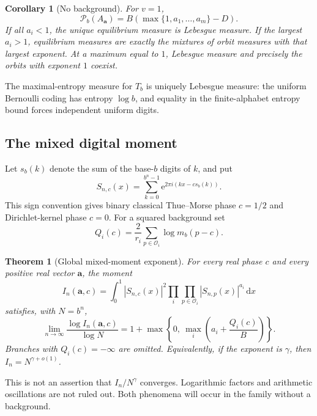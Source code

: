 \documentclass[11pt,a4paper]{article}
\numberwithin{equation}{section}
\newtheorem{theorem}{Theorem}[section]
\newtheorem{corollary}[corollary]{Corollary}\aliascntresetthe{corollary}
\theoremstyle{definition}
\theoremstyle{remark}
\newcommand{\dd}{\,\mathrm d}
\newcommand{\ee}{\mathrm e}
\newcommand{\cO}{\mathcal O}
\newcommand{\PP}{\mathcal P}
\begin{document}
\begin{corollary}[No background]
\label{cor:no-background-pressure}
For $v=1$,
\begin{equation}
 \PP_b(A_{\boldsymbol a})
 =B\left(\max\{1,a_1,\ldots,a_m\}-D\right).
 \label{eq:pure-pressure}
\end{equation}
If all $a_i<1$, the unique equilibrium measure is Lebesgue measure.
If the largest $a_i>1$, equilibrium measures are exactly the mixtures
of orbit measures with that largest exponent. At a maximum equal to
$1$, Lebesgue measure and precisely the orbits with exponent $1$ coexist.
\end{corollary}
The maximal-entropy measure for $T_b$ is uniquely Lebesgue measure:
the uniform Bernoulli coding has entropy $\log b$, and equality in the
finite-alphabet entropy bound forces independent uniform digits.

\subsection{The mixed digital moment}
Let $s_b(k)$ denote the sum of the base-$b$ digits of $k$, and put
\begin{equation}
 S_{n,c}(x)=\sum_{k=0}^{b^n-1}
         \ee^{2\pi i(kx-cs_b(k))}.
 \label{eq:digital-sum}
\end{equation}
This sign convention gives binary classical Thue--Morse phase $c=1/2$
and Dirichlet-kernel phase $c=0$. For a squared background set
\begin{equation}
 Q_i(c)=\frac2{r_i}\sum_{p\in\cO_i}\log m_b(p-c).
 \label{eq:qi-c}
\end{equation}

\begin{theorem}[Global mixed-moment exponent]
\label{thm:mixed}
For every real phase $c$ and every positive real vector $\boldsymbol a$,
the moment
\begin{equation}
 I_n(\boldsymbol a,c)=\int_0^1|S_{n,c}(x)|^2
        \prod_i\prod_{p\in\cO_i}|S_{n,p}(x)|^{a_i}\dd x
 \label{eq:mixed-moment}
\end{equation}
satisfies, with $N=b^n$,
\begin{equation}
 \boxed{\quad
 \lim_{n\to\infty}\frac{\log I_n(\boldsymbol a,c)}{\log N}
 =1+\max\left\{0,\ \max_i\left(a_i+\frac{Q_i(c)}B\right)\right\}.
 \quad}
 \label{eq:mixed-exponent}
\end{equation}
Branches with $Q_i(c)=-\infty$ are omitted. Equivalently, if the exponent
is $\gamma$, then $I_n=N^{\gamma+o(1)}$.
\end{theorem}
This is not an assertion that $I_n/N^\gamma$ converges. Logarithmic
factors and arithmetic oscillations are not ruled out. Both phenomena
will occur in the family without a background.
\end{document}
